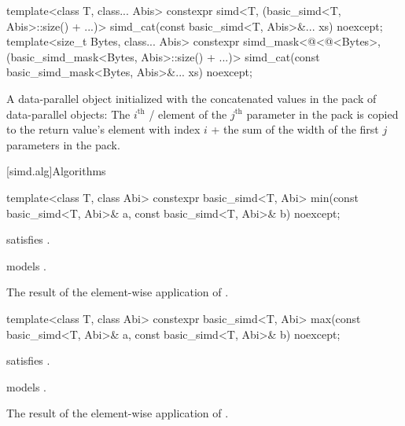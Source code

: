 \begin{itemdecl}
template<class T, class... Abis>
  constexpr simd<T, (basic_simd<T, Abis>::size() + ...)>
    simd_cat(const basic_simd<T, Abis>&... xs) noexcept;
template<size_t Bytes, class... Abis>
  constexpr simd_mask<@\deducet@<@\integerfrom@<Bytes>, (basic_simd_mask<Bytes, Abis>::size() + ...)>
    simd_cat(const basic_simd_mask<Bytes, Abis>&... xs) noexcept;

\end{itemdecl}

\begin{itemdescr}
  \pnum\returns
  A data-parallel object initialized with the concatenated values in the  pack of data-parallel objects: The $i^\text{th}$ / element of the $j^\text{th}$ parameter in the  pack is copied to the return value's element with index $i$ + the sum of the width of the first $j$ parameters in the  pack.
\end{itemdescr}

[simd.alg]{Algorithms}

\begin{itemdecl}
template<class T, class Abi>
  constexpr basic_simd<T, Abi> min(const basic_simd<T, Abi>& a, const basic_simd<T, Abi>& b) noexcept;
\end{itemdecl}

\begin{itemdescr}
  \pnum\constraints
   satisfies .

  \pnum\expects
   models .

  \pnum\returns
  The result of the element-wise application of  \foralli.
\end{itemdescr}

\begin{itemdecl}
template<class T, class Abi>
  constexpr basic_simd<T, Abi> max(const basic_simd<T, Abi>& a, const basic_simd<T, Abi>& b) noexcept;
\end{itemdecl}

\begin{itemdescr}
  \pnum\constraints
   satisfies .

  \pnum\expects
   models .

  \pnum\returns
  The result of the element-wise application of  \foralli.
\end{itemdescr}

